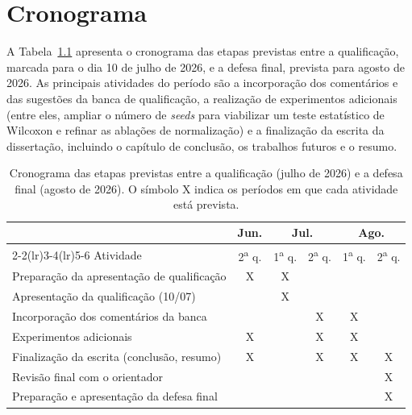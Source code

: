 \chapter{Cronograma}
\label{cap:cronograma}

A Tabela~\ref{tab:cronograma} apresenta o cronograma das etapas previstas entre a qualificação, marcada para o dia 10 de julho de 2026, e a defesa final, prevista para agosto de 2026. As principais atividades do período são a incorporação dos comentários e das sugestões da banca de qualificação, a realização de experimentos adicionais (entre eles, ampliar o número de \textit{seeds} para viabilizar um teste estatístico de Wilcoxon e refinar as ablações de normalização) e a finalização da escrita da dissertação, incluindo o capítulo de conclusão, os trabalhos futuros e o resumo.

\begin{table}[h!]
\centering
\caption{Cronograma das etapas previstas entre a qualificação (julho de 2026) e a defesa final (agosto de 2026). O símbolo X indica os períodos em que cada atividade está prevista.}
\label{tab:cronograma}
\begin{tabular}{lccccc}
\toprule
 & Jun. & \multicolumn{2}{c}{Jul.} & \multicolumn{2}{c}{Ago.} \\
\cmidrule(lr){2-2}\cmidrule(lr){3-4}\cmidrule(lr){5-6}
Atividade & 2\textsuperscript{a} q. & 1\textsuperscript{a} q. & 2\textsuperscript{a} q. & 1\textsuperscript{a} q. & 2\textsuperscript{a} q. \\
\midrule
Preparação da apresentação de qualificação        & X & X &   &   &   \\
Apresentação da qualificação (10/07)               &   & X &   &   &   \\
Incorporação dos comentários da banca              &   &   & X & X &   \\
Experimentos adicionais                            & X &   & X & X &   \\
Finalização da escrita (conclusão, resumo)         & X &   & X & X & X \\
Revisão final com o orientador                     &   &   &   &   & X \\
Preparação e apresentação da defesa final          &   &   &   &   & X \\
\bottomrule
\end{tabular}
\end{table}
